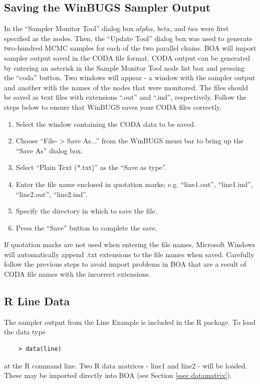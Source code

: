 \documentclass[12pt,letterpaper]{report}
\begin{document}
\subsection{Saving the WinBUGS Sampler Output}
\noindent In the ``Sampler Monitor Tool'' dialog box $alpha$,
$beta$, and $tau$ were first specified as the nodes.  Then, the
``Update Tool'' dialog box was used to generate two-hundred MCMC
samples for each of the two parallel chains. BOA will import
sampler output saved in the CODA file format.  CODA output can be
generated by entering an asterisk in the Sample Monitor Tool node
list box and pressing the ``coda'' button.  Two windows will
appear - a window with the sampler output and another with the
names of the nodes that were monitored.  The files should be saved
as text files with extensions ``.out'' and ``.ind'', respectively.
Follow the steps below to ensure that WinBUGS saves your CODA
files correctly.
\begin{enumerate}
\item Select the window containing the CODA data to be saved.
\item Choose ``File-$>$Save As...'' from the WinBUGS menu bar to
bring up the ``Save As'' dialog box.
\item Select ``Plain Text (*.txt)'' as the ``Save as type''.
\item Enter the file name enclosed in quotation marks; e.g.
``line1.out'', ``line1.ind'', ``line2.out'', ``line2.ind''.
\item Specify the directory in which to save the file.
\item Press the ``Save'' button to complete the save.
\end{enumerate}
If quotation marks are not used when entering the file names,
Microsoft Windows will automatically append .txt extensions to the
file names when saved.  Carefully follow the previous steps to
avoid import problems in BOA that are a result of CODA file names
with the incorrect extensions.


\subsection{R Line Data}
\noindent The sampler output from the Line Example is included in
the R package.  To load the data type
\begin{small}
\begin{verbatim}
    > data(line)
\end{verbatim}
\end{small}
at the R command line.  Two R data matrices - line1 and line2 -
will be loaded.  These may be imported directly into BOA (see
Section \ref{ssec.datamatrix}).
\end{document}
